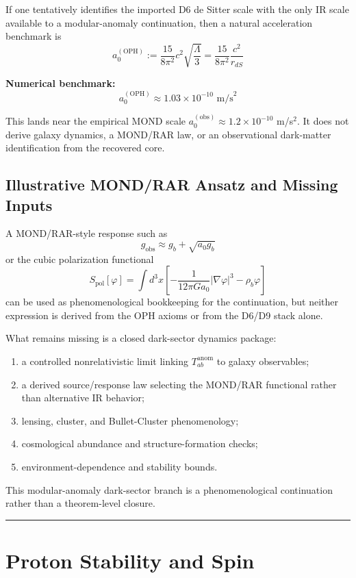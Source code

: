 If one tentatively identifies the imported D6 de Sitter scale with the only IR scale available to a modular-anomaly continuation, then a natural acceleration benchmark is \[a_0^{(\text{OPH})} := \frac{15}{8\pi^2} c^2 \sqrt{\frac{\Lambda}{3}} = \frac{15}{8\pi^2} \frac{c^2}{r_{dS}}\]

\textbf{Numerical benchmark:} \[a_0^{(\text{OPH})} \approx 1.03 \times 10^{-10} \text{ m/s}^2\]

This lands near the empirical MOND scale \(a_0^{(\text{obs})} \approx 1.2 \times 10^{-10}\) m/s\(^2\). It does not derive galaxy dynamics, a MOND/RAR law, or an observational dark-matter identification from the recovered core.

\subsection{Illustrative MOND/RAR Ansatz and Missing Inputs}\label{95-polarization-response-mond-like-scaling}

A MOND/RAR-style response such as \[g_{\text{obs}} \approx g_b + \sqrt{a_0 g_b}\]
or the cubic polarization functional \[S_{\text{pol}}[\varphi] = \int d^3x \left[-\frac{1}{12\pi G a_0}|\nabla\varphi|^3 - \rho_b \varphi\right]\]
can be used as phenomenological bookkeeping for the continuation, but neither expression is derived from the OPH axioms or from the D6/D9 stack alone.

What remains missing is a closed dark-sector dynamics package:
\begin{enumerate}
\item a controlled nonrelativistic limit linking \(T_{ab}^{\text{anom}}\) to galaxy observables;
\item a derived source/response law selecting the MOND/RAR functional rather than alternative IR behavior;
\item lensing, cluster, and Bullet-Cluster phenomenology;
\item cosmological abundance and structure-formation checks;
\item environment-dependence and stability bounds.
\end{enumerate}

This modular-anomaly dark-sector branch is a phenomenological continuation rather than a theorem-level closure.

\begin{center}\rule{0.5\linewidth}{0.5pt}\end{center}

\section{Proton Stability and Spin}\label{10-proton-stability-and-spin}

